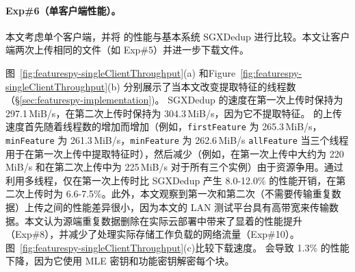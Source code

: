 \paragraph*{Exp\#6（单客户端性能）。}
本文考虑单个客户端，并将 \prototype 的性能与基本系统 SGXDedup 进行比较。本文让客户端两次上传相同的文件（如 Exp\#5）并进一步下载文件。


图~\ref{fig:featurespy-singleClientThroughput}(a) 和Figure~\ref{fig:featurespy-singleClientThroughput}(b) 分别展示了当本文改变提取特征的线程数（\S\ref{sec:featurespy-implementation})。 SGXDedup 的速度在第一次上传时保持为 297.1\,MiB/s，在第二次上传时保持为 304.3\,MiB/s，因为它不提取特征。 \prototype 的上传速度首先随着线程数的增加而增加（例如，{\tt firstFeature} 为 265.3\,MiB/s，{\tt minFeature} 为 261.3\,MiB/s，{\tt minFeature} 为 262.6\,MiB/s {\tt allFeature} 当三个线程用于在第一次上传中提取特征时），然后减少（例如，在第一次上传中大约为 220\,MiB/s 和在第二次上传中为 225\,MiB/s 对于所有三个实例）由于资源争用。通过利用多线程，\prototype 仅在第一次上传时比 SGXDedup 产生 8.0-12.0\% 的性能开销，在第二次上传时为 6.6-7.5\%。此外，本文观察到第一次和第二次（不需要传输重复数据）上传之间的性能差异很小，因为本文的 LAN 测试平台具有高带宽来传输数据。本文认为源端重复数据删除在实际云部署中带来了显着的性能提升（Exp\#8），并减少了处理实际存储工作负载的网络流量（Exp\#10）。图~\ref{fig:featurespy-singleClientThroughput}(c)比较下载速度。 \prototype 会导致 1.3\% 的性能下降，因为它使用 MLE 密钥和功能密钥解密每个块。


